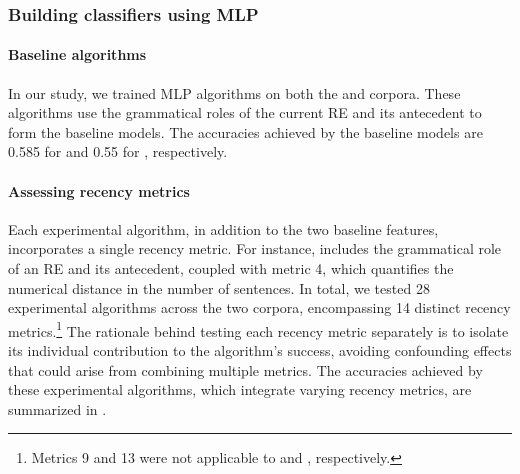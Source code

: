 \subsubsection{Building classifiers using MLP}\label{subsec:study}

\paragraph*{Baseline algorithms} 

In our study, we trained MLP algorithms on both the \msrcor and \wsj corpora. These algorithms use the grammatical roles of the current RE and its antecedent to form the baseline models. The accuracies achieved by the baseline models are 0.585 for \msrcor and 0.55 for \wsj, respectively.

\paragraph*{Assessing recency metrics}

Each experimental algorithm, in addition to the two baseline features, incorporates a single recency metric. For instance,  includes the grammatical role of an RE and its antecedent, coupled with metric 4, which quantifies the numerical distance in the number of sentences. In total, we tested 28 experimental algorithms across the two corpora, encompassing 14 distinct recency metrics.\footnote{Metrics 9 and 13 were not applicable to \wsj and \msrcor, respectively.} The rationale behind testing each recency metric separately is to isolate its individual contribution to the algorithm's success, avoiding confounding effects that could arise from combining multiple metrics. The accuracies achieved by these experimental algorithms, which integrate varying recency metrics, are summarized in .

